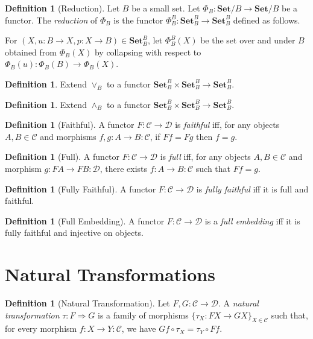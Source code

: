 \documentclass{book}
\theoremstyle{definition}
\newtheorem{df}[ax]{Definition}
\newcommand{\Set}{\ensuremath{\mathbf{Set}}}
\begin{document}
\begin{df}[Reduction]
Let $B$ be a small set.
Let $\Phi_B : \Set / B \rightarrow \Set / B$ be a functor. The \emph{reduction} of $\Phi_B$ is the functor $\Phi_B^B : \Set_B^B \rightarrow \Set_B^B$ defined as follows.

For $(X, u : B \rightarrow X, p : X \rightarrow B) \in \Set_B^B$, let $\Phi_B^B(X)$ be the set over and under $B$ obtained from $\Phi_B(X)$ by collapsing with respect to $\Phi_B(u) : \Phi_B(B) \rightarrow \Phi_B(X)$.
\end{df}

\begin{df}
Extend $\vee_B$ to a functor $\Set_B^B \times \Set_B^B \rightarrow \Set_B^B$.
\end{df}

\begin{df}
Extend $\wedge_B$ to a functor $\Set_B^B \times \Set_B^B \rightarrow \Set_B^B$.
\end{df}

\begin{df}[Faithful]
A functor $F : \mathcal{C} \rightarrow \mathcal{D}$ is \emph{faithful} iff, for any objects $A,B \in \mathcal{C}$ and morphisms $f,g : A \rightarrow B : \mathcal{C}$, if $Ff = Fg$ then $f = g$.
\end{df}

\begin{df}[Full]
A functor $F : \mathcal{C} \rightarrow \mathcal{D}$ is \emph{full} iff, for any objects $A, B \in \mathcal{C}$ and morphism $g : FA \rightarrow FB : \mathcal{D}$, there exists $f : A \rightarrow B : \mathcal{C}$ such that $Ff = g$.
\end{df}

\begin{df}[Fully Faithful]
A functor $F : \mathcal{C} \rightarrow \mathcal{D}$ is \emph{fully faithful} iff it is full and faithful.
\end{df}

\begin{df}[Full Embedding]
A functor $F : \mathcal{C} \rightarrow \mathcal{D}$ is a \emph{full embedding} iff it is fully faithful and injective on objects.
\end{df}

\section{Natural Transformations}

\begin{df}[Natural Transformation]
Let $F,G : \mathcal{C} \rightarrow \mathcal{D}$. A \emph{natural transformation} $\tau : F \Rightarrow G$ is a family of morphisms $\{ \tau_X : F X \rightarrow G X \}_{X \in \mathcal{C}}$ such that, for every morphism $f : X \rightarrow Y : \mathcal{C}$, we have $Gf \circ \tau_X = \tau_Y \circ Ff$.
\end{df}
\end{document}
